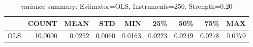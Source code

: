 \begin{table}[ht]
\centering
\caption{variance summary: Estimator=OLS, Instruments=250, Strength=0.20}
\begin{tabular}{lrrrrrrrr}
\toprule
 & COUNT & MEAN & STD & MIN & 25\% & 50\% & 75\% & MAX \\
\midrule
OLS & 10.0000 & 0.0252 & 0.0060 & 0.0163 & 0.0223 & 0.0249 & 0.0278 & 0.0370 \\
\bottomrule
\end{tabular}
\end{table}
